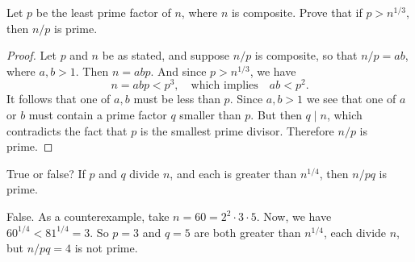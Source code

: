  Let $p$ be the least prime factor of $n$, where $n$ is
composite. Prove that if $p > n^{1/3}$, then $n/p$ is prime.
\begin{proof}
  Let $p$ and $n$ be as stated, and suppose $n/p$ is composite, so
  that $n/p = ab$, where $a,b > 1$. Then $n = abp$. And since
  $p > n^{1/3}$, we have
  \begin{equation*}
    n = abp < p^3,
    \quad\text{which implies}\quad
    ab < p^2.
  \end{equation*}
  It follows that one of $a,b$ must be less than $p$. Since $a,b > 1$
  we see that one of $a$ or $b$ must contain a prime factor $q$
  smaller than $p$. But then $q\mid n$, which contradicts the fact
  that $p$ is the smallest prime divisor. Therefore $n/p$ is prime.
\end{proof}

 True or false? If $p$ and $q$ divide $n$, and each is
greater than $n^{1/4}$, then $n/pq$ is prime.
\begin{solution}
  False. As a counterexample, take $n = 60 = 2^2\cdot3\cdot5$. Now, we
  have $60^{1/4} < 81^{1/4} = 3$. So $p = 3$ and $q = 5$ are both
  greater than $n^{1/4}$, each divide $n$, but $n/pq = 4$ is not
  prime.
\end{solution}
